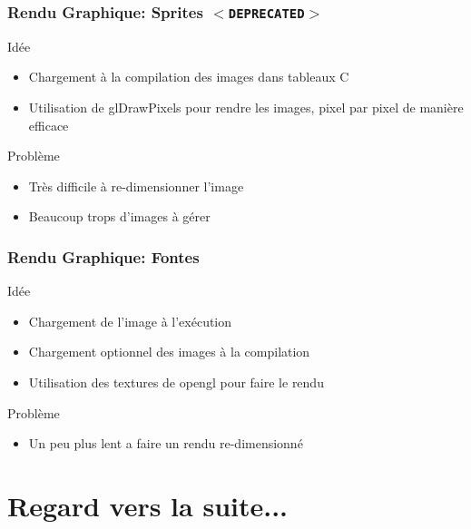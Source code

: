 \documentclass{beamer}
\newcommand{\<}[1]{\`#1}
\begin{document}
\begin{frame}
  \frametitle{Rendu Graphique: Sprites $<$\texttt{DEPRECATED}$>$}
  \begin{block}{Idée}
    \begin{itemize}
    \item Chargement à la compilation des images dans tableaux C
    \item Utilisation de glDrawPixels pour rendre les images, pixel par
      pixel de manière efficace
    \end{itemize}
  \end{block}
  
  \begin{block}{Problème}
    \begin{itemize}
    \item Très difficile à re-dimensionner l'image
    \item Beaucoup trops d'images à gérer
    \end{itemize}
  \end{block}
\end{frame}

\begin{frame}
  \frametitle{Rendu Graphique: Fontes}
  \begin{block}{Idée}
    \begin{itemize}
    \item Chargement de l'image à l'exécution
    \item Chargement optionnel des images à la compilation
    \item Utilisation des textures de opengl pour faire le rendu
    \end{itemize}
  \end{block}
  
  \begin{block}{Problème}
    \begin{itemize}
    \item Un peu plus lent a faire un rendu re-dimensionné
    \end{itemize}
  \end{block}
\end{frame}



\section{Regard vers la suite...}
\end{document}
